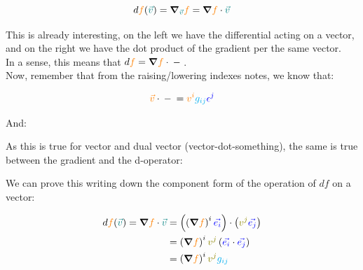 \begin{equation}
    d{\begingroup\color{orange}f\endgroup} (\begingroup\color{teal}\vec{v}\endgroup) = \grad_{\begingroup\color{teal}\vec{v}\endgroup}{\begingroup\color{orange}f\endgroup}
    = \grad{\begingroup\color{orange}f\endgroup} \cdot \begingroup\color{teal}\vec{v}\endgroup
\end{equation}

This is already interesting, on the left we have the differential acting on a vector, and on the right we have the dot product 
of the gradient per the same vector.\\

In a sense, this means that $d{\begingroup\color{orange}f\endgroup} = \grad{\begingroup\color{orange}f\endgroup} \cdot {{} - {}}$.\\

Now, remember that from the raising/lowering indexes notes, we know that:

\begin{equation}
    \begingroup\color{orange}\vec{v}\endgroup \cdot  {{} - {}} = \begingroup\color{orange}v^i\endgroup \begingroup\color{cyan}g_{ij}\endgroup \begingroup\color{blue}\epsilon^j\endgroup
\end{equation}

And:

\begin{center}

\end{center}

As this is true for vector and dual vector (vector-dot-something), the same is true between the 
gradient and the d-operator:

\begin{center}

\end{center}

We can prove this writing down the component form of the operation of $df$ on a vector:

\begin{align*}
    d{\begingroup\color{orange}f\endgroup} (\begingroup\color{teal}\vec{v}\endgroup) = \grad{\begingroup\color{orange}f\endgroup} \cdot \begingroup\color{teal}\vec{v}\endgroup &=
    \left(\left(\grad{\begingroup\color{orange}f\endgroup}\right)^i \begingroup\color{blue}\vec{e_i}\endgroup\right)
    \cdot \left(\begingroup\color{olive}v^j\endgroup\begingroup\color{blue}\vec{e_j}\endgroup\right)\\
    &= \left(\grad{\begingroup\color{orange}f\endgroup}\right)^i \begingroup\color{olive}v^j\endgroup 
    \left(\begingroup\color{blue}\vec{e_i}\endgroup \cdot \begingroup\color{blue}\vec{e_j}\endgroup\right)\\
    &= \left(\grad{\begingroup\color{orange}f\endgroup}\right)^i \begingroup\color{olive}v^j\endgroup 
    \begingroup\color{cyan}g_{ij}\endgroup
\end{align*}

